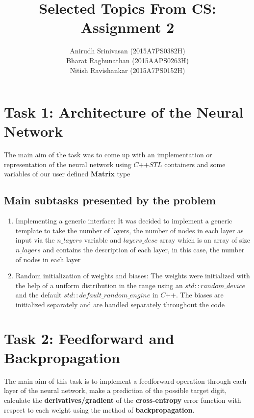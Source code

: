 \documentclass{article}
\begin{document}
\title{Selected Topics From CS: Assignment 2}
\author{Anirudh Srinivasan (2015A7PS0382H) \\ Bharat Raghunathan (2015AAPS0263H) \\ Nitish Ravishankar (2015A7PS0152H)} 
\maketitle

\tableofcontents

\section{Task 1: Architecture of the Neural Network}
The main aim of the task was to come up with an implementation or representation of the neural network using $C\textrm{++} STL$ containers and 
some variables of our user defined \textbf{Matrix} type
\subsection{Main subtasks presented by the problem}
\begin{enumerate}
	\item Implementing a generic interface:  It was decided to implement a generic template to take the number of layers, the number of nodes in 
	      each layer as input via the 
	      $n\_layers$ variable and $layers\_desc$ array which is an array of size $n\_layers$ and contains the description of each layer, in this 
	      case, the number of nodes in each layer
	\item Random initialization of weights and biases: The weights were initialized with the help of a uniform distribution in the range %
	      using an $std::random\_device$ and the default $std::default\_random\_engine$ in $C\textrm{++}$. 
	      The biases are initialized separately and are handled separately throughout the code
\end{enumerate}

\section{Task 2: Feedforward and Backpropagation}
The main aim of this task is to implement a feedforward operation through each layer of the neural network, make a prediction of 
the possible target digit, calculate the \textbf{derivatives/gradient} of the \textbf{cross-entropy} error function with respect to each weight 
using the method of \textbf{backpropagation}.
\end{document}
